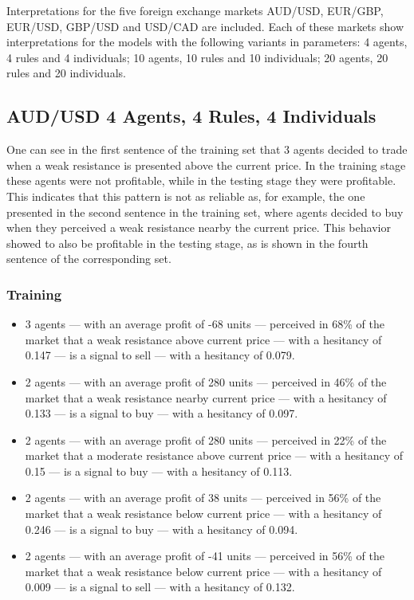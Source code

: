 Interpretations for the five foreign exchange markets AUD/USD, EUR/GBP, EUR/USD,
GBP/USD and USD/CAD are included. Each of these markets show interpretations for
the models with the following variants in parameters: 4 agents, 4 rules and 4
individuals; 10 agents, 10 rules and 10 individuals; 20 agents, 20 rules and 20
individuals.

\subsection{AUD/USD 4 Agents, 4 Rules, 4 Individuals}
\label{}

One can see in the first sentence of the training set that 3 agents decided to
trade when a weak resistance is presented above the current price. In the
training stage these agents were not profitable, while in the testing stage they
were profitable. This indicates that this pattern is not as reliable as, for
example, the one presented in the second sentence in the training set, where
agents decided to buy when they perceived a weak resistance nearby the current
price. This behavior showed to also be profitable in the testing stage, as is
shown in the fourth sentence of the corresponding set.

\subsubsection{Training}
\label{}

{\small
  \begin{itemize}
  \item 3 agents — with an average profit of -68 units — perceived in 68\% of
    the market that a weak resistance above current price — with a hesitancy of
    0.147 — is a signal to sell — with a hesitancy of 0.079.
  \item 2 agents — with an average profit of 280 units — perceived in 46\% of
    the market that a weak resistance nearby current price — with a hesitancy of
    0.133 — is a signal to buy — with a hesitancy of 0.097.
  \item 2 agents — with an average profit of 280 units — perceived in 22\% of
    the market that a moderate resistance above current price — with a hesitancy
    of 0.15 — is a signal to buy — with a hesitancy of 0.113.
  \item 2 agents — with an average profit of 38 units — perceived in 56\% of the
    market that a weak resistance below current price — with a hesitancy of
    0.246 — is a signal to buy — with a hesitancy of 0.094.
  \item 2 agents — with an average profit of -41 units — perceived in 56\% of
    the market that a weak resistance below current price — with a hesitancy of
    0.009 — is a signal to sell — with a hesitancy of 0.132.
  \end{itemize}
}

